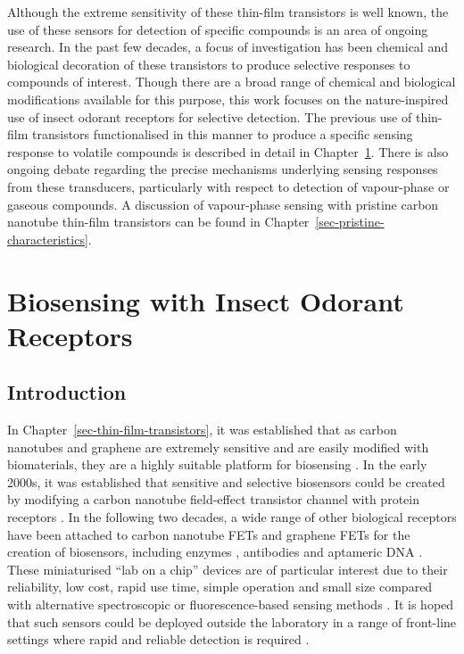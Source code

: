 \documentclass[
  a4paper,
]{scrbook}
\begin{document}
Although the extreme sensitivity of these thin-film transistors is well
known, the use of these sensors for detection of specific compounds is
an area of ongoing research. In the past few decades, a focus of
investigation has been chemical and biological decoration of these
transistors to produce selective responses to compounds of interest.
Though there are a broad range of chemical and biological modifications
available for this purpose, this work focuses on the nature-inspired use
of insect odorant receptors for selective detection. The previous use of
thin-film transistors functionalised in this manner to produce a
specific sensing response to volatile compounds is described in detail
in Chapter~\ref{sec-iOR-sensors}. There is also ongoing debate regarding
the precise mechanisms underlying sensing responses from these
transducers, particularly with respect to detection of vapour-phase or
gaseous compounds. A discussion of vapour-phase sensing with pristine
carbon nanotube thin-film transistors can be found in
Chapter~\ref{sec-pristine-characteristics}.


\hypertarget{sec-iOR-sensors}{%
\chapter{Biosensing with Insect Odorant
Receptors}\label{sec-iOR-sensors}}

\hypertarget{sec-biosensing-transducers}{%
\section{Introduction}\label{sec-biosensing-transducers}}

In Chapter~\ref{sec-thin-film-transistors}, it was established that as
carbon nanotubes and graphene are extremely sensitive and are easily
modified with biomaterials, they are a highly suitable platform for
biosensing \autocite{Kauffman2008,Ohno2010}. In the early 2000s, it was
established that sensitive and selective biosensors could be created by
modifying a carbon nanotube field-effect transistor channel with protein
receptors \autocite{Chen2003,Kauffman2008}. In the following two
decades, a wide range of other biological receptors have been attached
to carbon nanotube FETs and graphene FETs for the creation of
biosensors, including enzymes \autocite{Lee2009,Zhang2015a,Dudina2019},
antibodies \autocite{Kim2008,Jin2015,Tsang2019} and aptameric DNA
\autocite{Maehashi2007,Gao2016,Nguyen2021}. These miniaturised ``lab on
a chip'' devices are of particular interest due to their reliability,
low cost, rapid use time, simple operation and small size compared with
alternative spectroscopic or fluorescence-based sensing methods
\autocite{Khan2020}. It is hoped that such sensors could be deployed
outside the laboratory in a range of front-line settings where rapid and
reliable detection is required \autocite{Dung2018,Yang2018,Kim2022a}.
\end{document}
